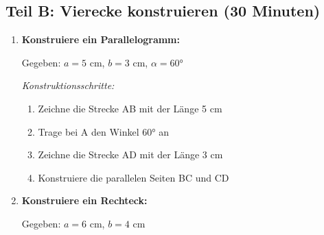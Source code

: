 \subsection*{Teil B: Vierecke konstruieren (30 Minuten)}

\begin{enumerate}[label=\arabic*.,resume]

    \item \textbf{Konstruiere ein Parallelogramm:}

    Gegeben: $a = 5$ cm, $b = 3$ cm, $\alpha = 60°$

    \textit{Konstruktionsschritte:}
    \begin{enumerate}[label=\alph*)]
        \item Zeichne die Strecke AB mit der Länge 5 cm
        \item Trage bei A den Winkel 60° an
        \item Zeichne die Strecke AD mit der Länge 3 cm  
        \item Konstruiere die parallelen Seiten BC und CD
    \end{enumerate}

    \vspace{6cm}

    \item \textbf{Konstruiere ein Rechteck:}

    Gegeben: $a = 6$ cm, $b = 4$ cm

    \vspace{6cm}

\end{enumerate}